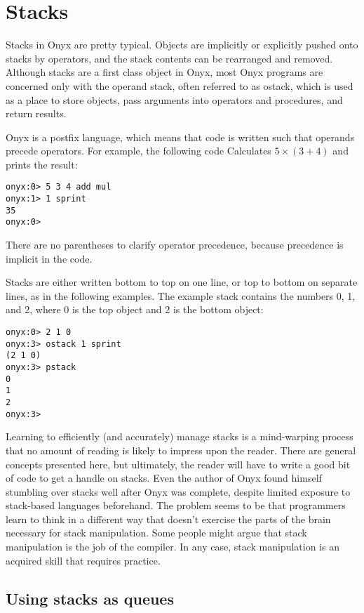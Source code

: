\section{Stacks}

Stacks in Onyx are pretty typical.  Objects are implicitly or explicitly pushed
onto stacks by operators, and the stack contents can be rearranged and removed.
Although stacks are a first class object in Onyx, most Onyx programs are
concerned only with the operand stack, often referred to as ostack, which is
used as a place to store objects, pass arguments into operators and procedures,
and return results.

Onyx is a postfix language, which means that code is written such that operands
precede operators.  For example, the following code Calculates $5 \times (3 +
4)$ and prints the result:

\begin{verbatim}
onyx:0> 5 3 4 add mul
onyx:1> 1 sprint
35
onyx:0>
\end{verbatim}

There are no parentheses to clarify operator precedence, because precedence is
implicit in the code.

Stacks are either written bottom to top on one line, or top to bottom on
separate lines, as in the following examples.  The example stack contains the
numbers 0, 1, and 2, where 0 is the top object and 2 is the bottom object:

\begin{verbatim}
onyx:0> 2 1 0
onyx:3> ostack 1 sprint
(2 1 0)
onyx:3> pstack
0
1
2
onyx:3>
\end{verbatim}

Learning to efficiently (and accurately) manage stacks is a mind-warping process
that no amount of reading is likely to impress upon the reader.  There are
general concepts presented here, but ultimately, the reader will have to write a
good bit of code to get a handle on stacks.  Even the author of Onyx found
himself stumbling over stacks well after Onyx was complete, despite limited
exposure to stack-based languages beforehand.  The problem seems to be that
programmers learn to think in a different way that doesn't exercise the parts of
the brain necessary for stack manipulation.  Some people might argue that stack
manipulation is the job of the compiler.  In any case, stack manipulation is an
acquired skill that requires practice.

\subsection{Using stacks as queues}

